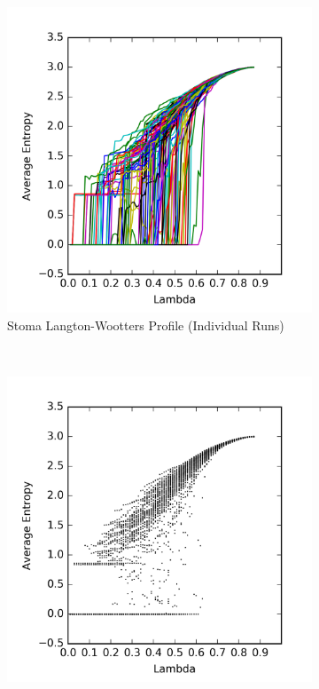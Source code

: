 \documentclass[a4paper,11pt]{report}
\begin{document}
\begin{figure}[htp]
\centering
\begin{subfigure}[t]{0.6\textwidth}
  \includegraphics[width=\textwidth]{ch6_figs/stoma_entropy}
  \caption{Stoma Langton-Wootters Profile (Individual Runs)}
  \label{fig:stoma_lw_run}
\end{subfigure}
~
\begin{subfigure}[t]{0.6\textwidth}
  \centering
  \includegraphics[width=\textwidth]{ch6_figs/stoma_entropy_scatter}

\end{subfigure}
\end{figure}
\end{document}
